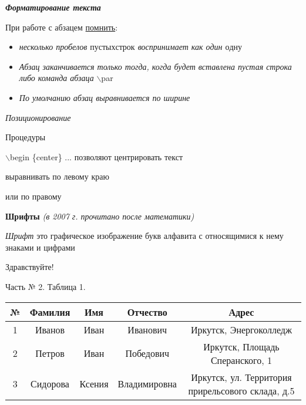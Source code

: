 \documentclass{article}
\begin{document}
\begin{center} \LARGE \bf{{ \textit{Форматирование текста} }} \end {center}

При работе  с абзацем \LARGE  \underline{помнить}:  \normalsize \newline
 
{}
\begin {itemize}
\item \textit{несколько пробелов \(пустых строк\) воспринимает как один \(одну\)}
\item \textit{Абзац заканчивается только тогда, когда будет вставлена пустая строка либо команда абзаца} $\backslash $par
\item \textit{По умолчанию абзац выравнивается по ширине}
\end{itemize}

\textit{Позиционирование}

	\hspace{10pt}Процедуры
\begin{center}
$\backslash $begin \{center\} ...  позволяют центрировать текст \end{center}
\begin{flushleft} выравнивать по левому краю \end{flushleft}
\begin {flushright} или по правому \end {flushright}
\begin {center} 
\linespread{1.3}
{\bf Шрифты} {\it (в 2007 г. прочитано после математики)}
\end {center}

{\it Шрифт } это \LARGE графическое   изображение букв
алфавита \tiny с относящимися к нему знаками и цифрами

Здравствуйте!
\newline

\begin{center}
	Часть № 2.
	\newline
	Таблица 1.
	\newline

	\begin{tabular}{|c|c|c|c|c|}
	\hline 
	№ & Фамилия & Имя & Отчество & Адрес \\ 
	\hline 
	1 & Иванов & Иван & Иванович & Иркутск, Энергоколледж \\ 
	\hline 
	2 & Петров & Иван & Победович & Иркутск, Площадь Сперанского, 1 \\ 
	\hline 
	3 & Сидорова & Ксения & Владимировна & Иркутск, ул. Территория прирельсового склада, д.5 \\ 
	\hline 
	\end{tabular} 
\end{center}
\newpage
\end{document}
